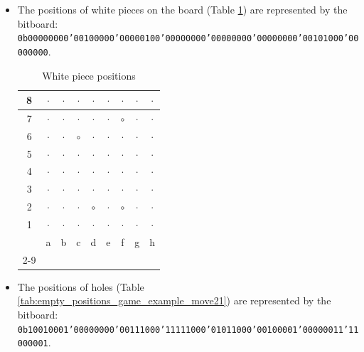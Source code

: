 \documentclass[12pt,a4paper,twoside,openright]{book}
\begin{document}
\begin{itemize}
\item The positions of white pieces on the board (Table \ref{tab:white_positions_game_example_move21}) are represented by the bitboard:
\texttt{0b00000000'00100000'00000100'00000000'00000000'00000000'00101000'00000000}.\\

\begin{table}[htpb]
\centering
\caption{White piece positions}
\label{tab:white_positions_game_example_move21}
\begin{tabular}{|c|c|c|c|c|c|c|c|c|}
\hline
8 & $\cdot$ & $\cdot$ & $\cdot$ & $\cdot$ & $\cdot$ & $\cdot$ & $\cdot$ & $\cdot$ \\ \hline
7 & $\cdot$ & $\cdot$ & $\cdot$ & $\cdot$ & $\cdot$ & $\circ$ & $\cdot$ & $\cdot$ \\ \hline
6 & $\cdot$ & $\cdot$ & $\circ$ & $\cdot$ & $\cdot$ & $\cdot$ & $\cdot$ & $\cdot$ \\ \hline
5 & $\cdot$ & $\cdot$ & $\cdot$ & $\cdot$ & $\cdot$ & $\cdot$ & $\cdot$ & $\cdot$ \\ \hline
4 & $\cdot$ & $\cdot$ & $\cdot$ & $\cdot$ & $\cdot$ & $\cdot$ & $\cdot$ & $\cdot$ \\ \hline
3 & $\cdot$ & $\cdot$ & $\cdot$ & $\cdot$ & $\cdot$ & $\cdot$ & $\cdot$ & $\cdot$ \\ \hline
2 & $\cdot$ & $\cdot$ & $\cdot$ & $\circ$ & $\cdot$ & $\circ$ & $\cdot$ & $\cdot$ \\ \hline
1 & $\cdot$ & $\cdot$ & $\cdot$ & $\cdot$ & $\cdot$ & $\cdot$ & $\cdot$ & $\cdot$ \\ \hline
\multicolumn{1}{c|}{} & a & b & c & d & e & f & g & h \\
\cline{2-9}
\end{tabular}
\end{table}

\item The positions of holes (Table \ref{tab:empty_positions_game_example_move21}) are represented by the bitboard:\\
\texttt{0b10010001'00000000'00111000'11111000'01011000'00100001'00000011'11000001}.\\


\end{itemize}
\end{document}
